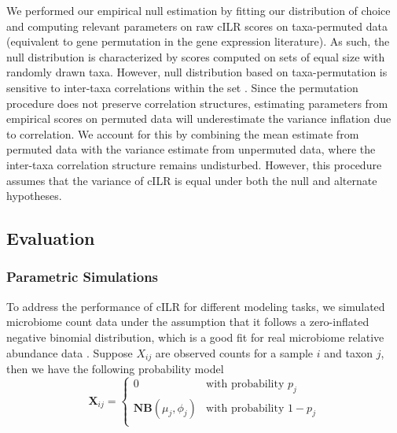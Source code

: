\documentclass{article}
\begin{document}
We performed our empirical null estimation by fitting our distribution of choice and computing relevant parameters on raw cILR scores on taxa-permuted data (equivalent to gene permutation in the gene expression literature). As such, the null distribution is characterized by scores computed on sets of equal size with randomly drawn taxa. However, null distribution based on taxa-permutation is sensitive to inter-taxa correlations within the set \cite{wu2012}. Since the permutation procedure does not preserve correlation structures, estimating parameters from empirical scores on permuted data will underestimate the variance inflation due to correlation. We account for this by combining the mean estimate from permuted data with the variance estimate from unpermuted data, where the inter-taxa correlation structure remains undisturbed. However, this procedure assumes that the variance of cILR is equal under both the null and alternate hypotheses. 

\subsection*{Evaluation}
\subsubsection*{Parametric Simulations}  
To address the performance of cILR for different modeling tasks, we simulated microbiome count data under the assumption that it follows a zero-inflated negative binomial distribution, which is a good fit for real microbiome relative abundance data \cite{calgaro2020}. Suppose $X_{ij}$ are observed counts for a sample $i$ and taxon $j$, then we have the following probability model
\begin{equation}
    \mathbf{X}_{ij} =
      \begin{cases}
        0 & \text{with probability $p_j$}\\
        \mathbf{NB}(\mu_j, \phi_j) & \text{with probability $1 - p_j$}\\
      \end{cases}       
\end{equation}
\end{document}
